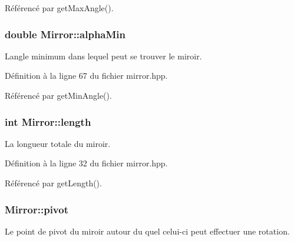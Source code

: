 Référencé par get\+Max\+Angle().

\hypertarget{classMirror_ac42fb9a193abfb984ca27bbad2564ff9}{}
\subsubsection[{alpha\+Min}]{\setlength{\rightskip}{0pt plus 5cm}double Mirror\+::alpha\+Min\hspace{0.3cm}{\ttfamily [private]}}\label{classMirror_ac42fb9a193abfb984ca27bbad2564ff9}


L\textquotesingle{}angle minimum dans lequel peut se trouver le miroir. 



Définition à la ligne 67 du fichier mirror.\+hpp.



Référencé par get\+Min\+Angle().

\hypertarget{classMirror_a03f7e5469eaa52fa2090542182f99fbd}{}
\subsubsection[{length}]{\setlength{\rightskip}{0pt plus 5cm}int Mirror\+::length\hspace{0.3cm}{\ttfamily [private]}}\label{classMirror_a03f7e5469eaa52fa2090542182f99fbd}


La longueur totale du miroir. 



Définition à la ligne 32 du fichier mirror.\+hpp.



Référencé par get\+Length().

\hypertarget{classMirror_aeec9a930fcc8f87373a5ca5c403edc53}{}
\subsubsection[{pivot}]{ Mirror\+::pivot\hspace{0.3cm}{\ttfamily [private]}}\label{classMirror_aeec9a930fcc8f87373a5ca5c403edc53}


Le point de pivot du miroir autour du quel celui-\/ci peut effectuer une rotation. 



